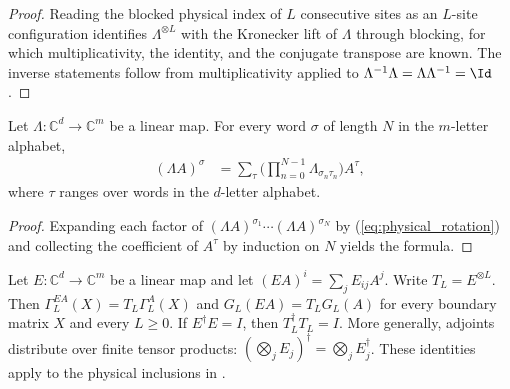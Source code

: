 \begin{proof}
    \leanok
    Reading the blocked physical index of $L$ consecutive sites as an
    $L$-site configuration identifies $\Lambda^{\otimes L}$ with the Kronecker
    lift of $\Lambda$ through blocking, for which multiplicativity, the
    identity, and the conjugate transpose are known. The inverse statements follow
    from multiplicativity applied to $\Lambda^{-1}\Lambda=\Lambda\Lambda^{-1}=\Id$.
\end{proof}

\begin{lemma}\label{thm:physical_rotation_word}
    \leanok
    Let $\Lambda:\mathbb C^d\to\mathbb C^m$ be a linear map.
    For every word $\sigma$ of length $N$ in the $m$-letter alphabet,
    \begin{align}
        (\Lambda A)^{\sigma}
         & =\sum_{\tau}\Big(\prod_{n=0}^{N-1}\Lambda_{\sigma_n\tau_n}\Big)A^{\tau},
        \label{eq:physical_rotation_word}
    \end{align}
    where $\tau$ ranges over words in the $d$-letter alphabet.
\end{lemma}

\begin{proof}
    \leanok
    Expanding each factor of $(\Lambda A)^{\sigma_1}\cdots(\Lambda A)^{\sigma_N}$ by
    (\ref{eq:physical_rotation}) and collecting the coefficient of $A^{\tau}$ by
    induction on $N$ yields the formula.
\end{proof}

\begin{lemma}
    \label{thm:spt_physical_embedding_boundary}
    \leanok
    Let $E:\mathbb C^d\to\mathbb C^m$ be a linear map and let
    $(EA)^i=\sum_jE_{ij}A^j$. Write $T_L=E^{\otimes L}$. Then
    $\Gamma_L^{EA}(X)=T_L\Gamma_L^A(X)$ and
    $G_L(EA)=T_LG_L(A)$ for every boundary matrix $X$ and every $L\ge0$.
    If $E^\dagger E=I$, then $T_L^\dagger T_L=I$.
    More generally, adjoints distribute over finite tensor products:
    $(\bigotimes_j E_j)^\dagger=\bigotimes_j E_j^\dagger$.
    These identities apply to the physical inclusions in
    \cite[Section~II.F.2]{Schuch2011Phases}.
\end{lemma}

